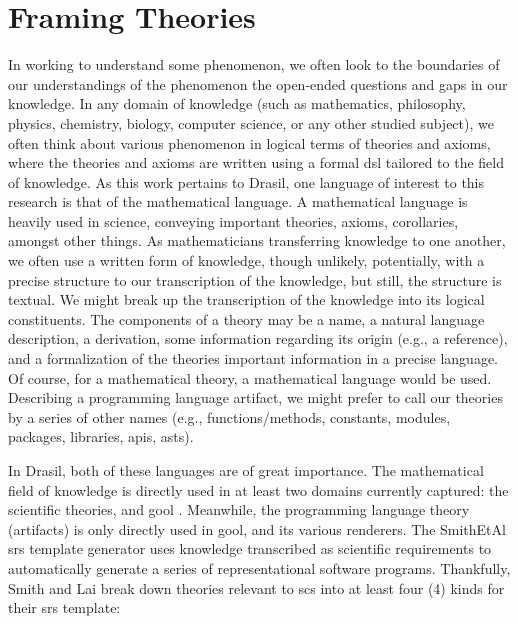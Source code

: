 
\chapter{Framing Theories}
\label{chap:modelkinds}

In working to understand some phenomenon, we often look to the boundaries of our
understandings of the phenomenon \textemdash{} the open-ended questions and gaps in our
knowledge. In any domain of knowledge (such as mathematics, philosophy, physics,
chemistry, biology, computer science, or any other studied subject), we often
think about various phenomenon in logical terms of theories and axioms, where
the theories and axioms are written using a formal \acs{dsl} tailored to the
field of knowledge. As this work pertains to Drasil, one language of interest to
this research is that of the mathematical language. A mathematical language is
heavily used in science, conveying important theories, axioms, corollaries,
amongst other things. As mathematicians transferring knowledge to one another,
we often use a written form of knowledge, though unlikely, potentially, with a
precise structure to our transcription of the knowledge, but still, the
structure is textual. We might break up the transcription of the knowledge into
its logical constituents. The components of a theory may be a name, a natural
language description, a derivation, some information regarding its origin (e.g.,
a reference), and a formalization of the theories important information in a
precise language. Of course, for a mathematical theory, a mathematical language
would be used. Describing a programming language artifact, we might prefer to
call our theories by a series of other names (e.g., functions/methods,
constants, modules, packages, libraries, \acsp{api}, \acsp{ast}).

In Drasil, both of these languages are of great importance. The mathematical
field of knowledge is directly used in at least two domains currently captured:
the scientific theories, and \acs{gool} \cite{Carette2019}. Meanwhile, the
programming language theory (artifacts) is only directly used in \acs{gool}, and
its various renderers. The SmithEtAl \acs{srs} \cite{SmithAndLai2005} template
generator uses knowledge transcribed as scientific requirements to automatically
generate a series of representational software programs. Thankfully, Smith and
Lai \cite{SmithAndLai2005} break down theories relevant to \acs{scs} into at
least four (4) kinds for their \acs{srs} template:

